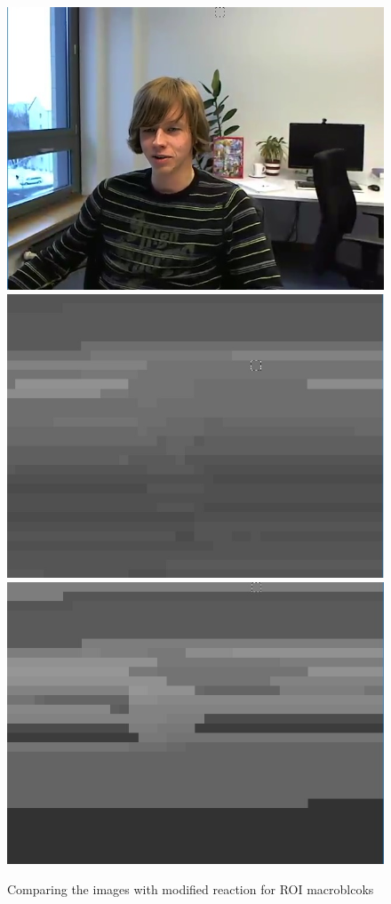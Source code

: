 \documentclass[11pt]{article} %
\begin{document}
\begin{figure}[!h]
    \includegraphics[scale=0.4]{BufferControl/paul120_250kbps_bufferControl}
    \includegraphics[scale=0.37]{PaulDefault120_91250kbps_quant}
    \includegraphics[scale=0.4]{BufferControl/paul120_250kbps_BufferControl_quant}    
    \caption{Comparing the images with modified reaction for ROI macroblcoks}
    \label{fig:Default_BufferControlCompare}
\end{figure}
\end{document}
